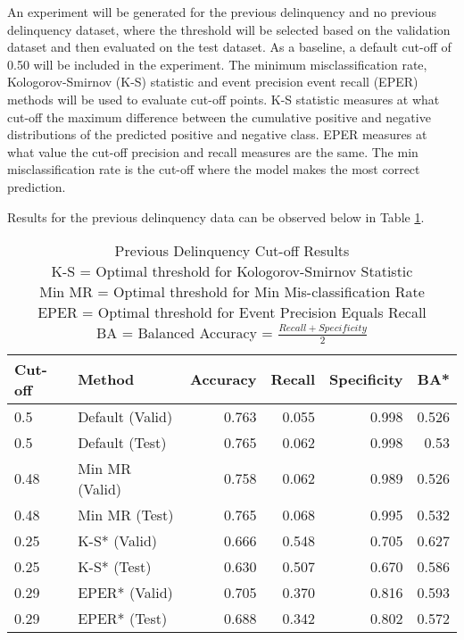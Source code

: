 An experiment will be generated for the previous delinquency and no previous delinquency dataset, where the threshold will be selected based on the validation dataset and then evaluated on the test dataset. As a baseline, a default cut-off of 0.50 will be included in the experiment. The minimum misclassification rate, Kologorov-Smirnov (K-S) statistic and event precision event recall (EPER) methods will be used to evaluate cut-off points. K-S statistic measures at what cut-off the maximum difference between the cumulative positive and negative distributions of the predicted positive and negative class. EPER measures at what value the cut-off precision and recall measures are the same. The min misclassification rate is the cut-off where the model makes the most correct prediction. 

Results for the previous delinquency data can be observed below in Table \ref{table:DelinquencyModelCutoff}. 	

\begin{table}[H]
	\centering
\small
		\begin{tabular}{|l|l|r|r|r|r|}
			\hline
			\textbf{Cut-off} & \textbf{Method}       & \textbf{Accuracy} & \textbf{Recall} & \textbf{Specificity}  & \textbf{BA*} \\ \hline
			0.5              & Default (Valid)       & 0.763             & 0.055           & 0.998                  & 0.526    \\
			0.5              & Default (Test)        & 0.765             & 0.062           & 0.998                    & 0.53  \\ \hline
			0.48             & Min MR (Valid)        & 0.758             & 0.062           & 0.989                       & 0.526 \\
			0.48             & Min MR (Test)         & \cellcolor{yellow!25}0.765         & 0.068                & \cellcolor{yellow!25}0.995    & 0.532   \\ \hline
			0.25             & K-S* (Valid) 		     & 0.666             & 0.548           & 0.705                    & 0.627  \\
			0.25             & K-S* (Test)  		     & 0.630             & \cellcolor{yellow!25}0.507                          & 0.670  & \cellcolor{yellow!25}0.586     \\ \hline
			0.29             & EPER* (Valid)          & 0.705             & 0.370           & 0.816                    & 0.593   \\
			0.29             & EPER* (Test)           & 0.688             & 0.342           & 0.802                 & 0.572    \\ \hline
		\end{tabular}
	\caption{Previous Delinquency Cut-off Results 
			\\ K-S = Optimal threshold for Kologorov-Smirnov Statistic
			\\ Min MR = Optimal threshold for Min Mis-classification Rate
			\\ EPER = Optimal threshold for Event Precision Equals Recall
			\\ BA = Balanced Accuracy = $\frac{Recall + Specificity }{2}$
		}
	\label{table:DelinquencyModelCutoff}
\end{table}

